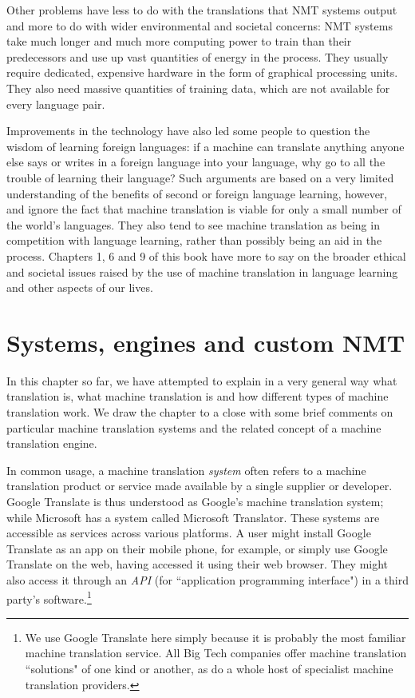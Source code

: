 \documentclass[output=paper]{langscibook}
\begin{document}
Other problems have less to do with the translations that NMT systems output and more to do with wider environmental and societal concerns: NMT systems take much longer and much more computing power to train than their predecessors and use up vast quantities of energy in the process. They usually require dedicated, expensive hardware in the form of graphical processing units. They also need massive quantities of training data, which are not available for every language pair.

Improvements in the technology have also led some people to question the wisdom of learning foreign languages: if a machine can translate anything anyone else says or writes in a foreign language into your language, why go to all the trouble of learning their language? Such arguments are based on a very limited understanding of the benefits of second or foreign language learning, however, and ignore the fact that machine translation is viable for only a small number of the world's languages. They also tend to see machine translation as being in competition with language learning, rather than possibly being an aid in the process. Chapters 1, 6 and 9 of this book have more to say on the broader ethical and societal issues raised by the use of machine translation in language learning and other aspects of our lives. 

\section{Systems, engines and custom NMT}
In this chapter so far, we have attempted to explain in a very general way what translation is, what machine translation is and how different types of machine translation work. We draw the chapter to a close with some brief comments on particular machine translation systems and the related concept of a machine translation engine.

In common usage, a machine translation \textit{system} often refers to a machine translation product or service made available by a single supplier or developer. Google Translate is thus understood as Google's machine translation system; while Microsoft has a system called Microsoft Translator. These systems are accessible as services across various platforms. A user might install Google Translate as an app on their mobile phone, for example, or simply use Google Translate on the web, having accessed it using their web browser. They might also access it through an \textit{API} (for “application programming interface") in a third party's software.\footnote{We use Google Translate here simply because it is probably the most familiar machine translation service. All Big Tech companies offer machine translation “solutions" of one kind or another, as do a whole host of specialist machine translation providers.}  
\end{document}

